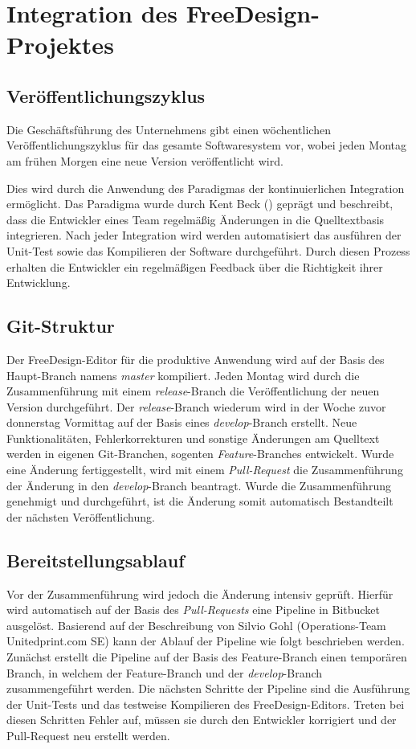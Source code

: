 \section{Integration des FreeDesign-Projektes}

\subsection{Veröffentlichungszyklus}
Die Geschäftsführung des Unternehmens gibt einen wöchentlichen Veröffentlichungszyklus für das gesamte Softwaresystem vor, wobei jeden Montag am frühen Morgen eine neue Version veröffentlicht wird. 

Dies wird durch die Anwendung des Paradigmas der kontinuierlichen Integration ermöglicht. 
Das Paradigma wurde durch Kent Beck (\citeyear[59]{Beck2004}) geprägt und beschreibt, dass die Entwickler eines Team regelmäßig Änderungen in die Quelltextbasis integrieren. Nach jeder Integration wird werden automatisiert das ausführen der Unit-Test sowie das Kompilieren der Software durchgeführt. Durch diesen Prozess erhalten die Entwickler ein regelmäßigen Feedback über die Richtigkeit ihrer Entwicklung.

\subsection{Git-Struktur}
Der FreeDesign-Editor für die produktive Anwendung wird auf der Basis des Haupt-Branch namens \emph{master} kompiliert. 
Jeden Montag wird durch die Zusammenführung mit einem \emph{release}-Branch die Veröffentlichung der neuen Version durchgeführt. 
Der \emph{release}-Branch wiederum wird in der Woche zuvor donnerstag Vormittag auf der Basis eines \emph{develop}-Branch erstellt. Neue Funktionalitäten, Fehlerkorrekturen und sonstige Änderungen am Quelltext werden in eigenen Git-Branchen, sogenten \emph{Feature}-Branches entwickelt. Wurde eine Änderung fertiggestellt, wird mit einem \emph{Pull-Request} die Zusammenführung der Änderung in den \emph{develop}-Branch beantragt.
Wurde die Zusammenführung genehmigt und durchgeführt, ist die Änderung somit automatisch Bestandteilt der nächsten Veröffentlichung. 


\subsection{Bereitstellungsablauf}
Vor der Zusammenführung wird jedoch die Änderung intensiv geprüft. Hierfür wird automatisch auf der Basis des \emph{Pull-Requests}
eine Pipeline in Bitbucket ausgelöst. 
Basierend auf der Beschreibung von Silvio Gohl (Operations-Team Unitedprint.com SE) kann der Ablauf der Pipeline wie folgt beschrieben werden.
Zunächst erstellt die Pipeline auf der Basis des Feature-Branch einen temporären Branch, in welchem der Feature-Branch und der \emph{develop}-Branch zusammengeführt werden. 
Die nächsten Schritte der Pipeline sind die Ausführung der Unit-Tests und das testweise Kompilieren des FreeDesign-Editors. Treten bei diesen Schritten Fehler auf, müssen sie durch den Entwickler korrigiert und der Pull-Request neu erstellt werden. 

